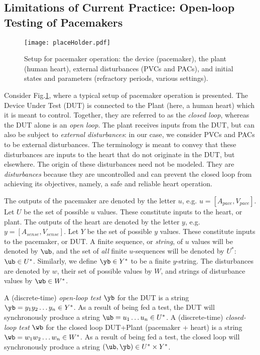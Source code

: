 \subsection{Limitations of Current Practice: Open-loop Testing of Pacemakers}
\label{todaysPractice}
\begin{figure}[tb]
	\centering
	\texttt{[image: placeHolder.pdf]}
	\caption{Setup for pacemaker operation: the device (pacemaker), the plant (human heart), external disturbances (PVCs and PACs), and initial states and parameters (refractory periods, various settings).}
	\label{fig:liveSetup}
\end{figure}
Consider Fig.\ref{fig:liveSetup}, where a typical setup of pacemaker operation is presented.
The Device Under Test (DUT) is connected to the Plant (here, a human heart) which it is meant to control.
Together, they are referred to as the \emph{closed loop}, whereas the DUT alone is an \emph{open loop}.
The plant receives inputs from the DUT, but can also be subject to \emph{external disturbances}: in our case, we consider PVCs and PACs to be external disturbances.
The terminology is meant to convey that these disturbances are inputs to the heart that do not originate in the DUT, but elsewhere. 
The origin of these disturbances need not be modeled.  
They are \emph{disturbances} because they are uncontrolled and can prevent the closed loop from achieving its objectives, namely, a safe and reliable heart operation.

The outputs of the pacemaker are denoted by the letter $u$, e.g. $u = [A_{pace}, V_{pace}]$.
Let $U$ be the set of possible $u$ values.
These constitute inputs to the heart, or plant.
The outputs of the heart are denoted by the letter $y$, e.g. $y = [A_{sense}, V_{sense}]$.
Let $Y$ be the set of possible $y$ values.
These constitute inputs to the pacemaker, or DUT.
A finite sequence, or \emph{string}, of $u$ values will be denoted by $\ub$, and the set of \emph{all} finite $u$-sequences will be denoted by $U^*$: $\ub \in U^*$.
Similarly, we define $\yb \in Y^*$ to be a finite $y$-string.
The disturbances are denoted by $w$, their set of possible values by $W$, and strings of disturbance values by $\wb \in W^*$.

A (discrete-time) \emph{open-loop test} $\yb$ for the DUT is a string $\yb = y_1 y_2 \ldots y_n \in Y^*$.
As a result of being fed a test, the DUT will synchronously produce a string $\ub = u_1 \ldots u_n \in U^*$.
A (discrete-time) \emph{closed-loop test} $\wb$ for the closed loop DUT+Plant (pacemaker + heart) is a string $\wb = w_1 w_2 \ldots w_n \in W^*$.
As a result of being fed a test, the closed loop will synchronously produce a string $(\ub,\yb) \in U^* \times Y^*$.

